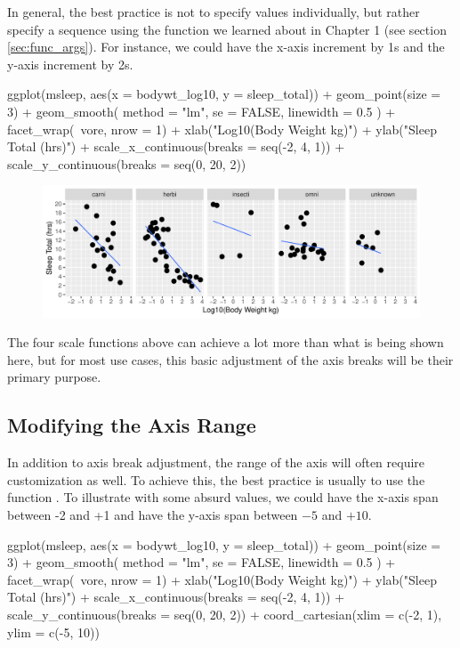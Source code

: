 In general, the best practice is not to specify values individually, but rather specify a sequence using the  function we learned about in Chapter 1 (see section \ref{sec:func_args}). For instance, we could have the x-axis increment by 1s and the y-axis increment by 2s.

\begin{inR}
ggplot(msleep, aes(x = bodywt_log10, y = sleep_total)) +
  geom_point(size = 3) +
  geom_smooth(
    method = "lm",
    se = FALSE,
    linewidth = 0.5
  ) +
  facet_wrap(~vore, nrow = 1) +
  xlab("Log10(Body Weight kg)") + 
  ylab("Sleep Total (hrs)") + 
  scale_x_continuous(breaks = seq(-2, 4, 1)) +
  scale_y_continuous(breaks = seq(0, 20, 2))
\end{inR}

\vspace{2em}

\begin{figure}[H]
\includegraphics[scale = .75]{graphics/ch2Figs/ggEx_18.pdf}
\end{figure}

The four scale functions above can achieve a lot more than what is being shown here, but for most use cases, this basic adjustment of the axis breaks will be their primary purpose.

\subsection{Modifying the Axis Range}

In addition to axis break adjustment, the range of the axis will often require customization as well.  To achieve this, the best practice is usually to use the function .  To illustrate with some absurd values, we could have the x-axis span between -2 and +1 and have the y-axis span between $-5$ and $+10$.

\begin{inR}
ggplot(msleep, aes(x = bodywt_log10, y = sleep_total)) +
  geom_point(size = 3) +
  geom_smooth(
    method = "lm",
    se = FALSE,
    linewidth = 0.5
  ) +
  facet_wrap(~vore, nrow = 1) +
  xlab("Log10(Body Weight kg)") + 
  ylab("Sleep Total (hrs)") +
  scale_x_continuous(breaks = seq(-2, 4, 1)) +
  scale_y_continuous(breaks = seq(0, 20, 2)) +
  coord_cartesian(xlim = c(-2, 1), ylim = c(-5, 10))
\end{inR}

